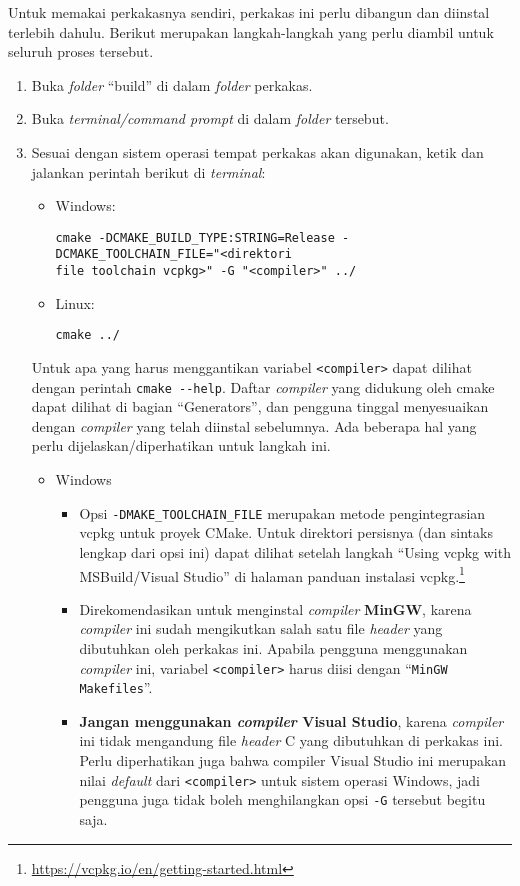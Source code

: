 Untuk memakai perkakasnya sendiri, perkakas ini perlu dibangun dan diinstal terlebih dahulu. Berikut merupakan langkah-langkah yang perlu diambil untuk seluruh proses tersebut.

\begin{enumerate}
	\item Buka \textit{folder} ``build'' di dalam \textit{folder} perkakas.
	\item Buka \textit{terminal/command prompt} di dalam \textit{folder} tersebut.
	\item Sesuai dengan sistem operasi tempat perkakas akan digunakan, ketik dan jalankan perintah berikut di \textit{terminal}:
	
	\begin{itemize}
		\item Windows:
		\begin{verbatim}
cmake -DCMAKE_BUILD_TYPE:STRING=Release -DCMAKE_TOOLCHAIN_FILE="<direktori
file toolchain vcpkg>" -G "<compiler>" ../
		\end{verbatim}
	
		\item Linux:
		\begin{verbatim}
cmake ../
		\end{verbatim}
	\end{itemize}		

	Untuk apa yang harus menggantikan variabel \verb|<compiler>| dapat dilihat dengan perintah \verb|cmake --help|. Daftar \textit{compiler} yang didukung oleh cmake dapat dilihat di bagian \mbox{``Generators''}, dan pengguna tinggal menyesuaikan dengan \textit{compiler} yang telah diinstal sebelumnya.  Ada beberapa hal yang perlu dijelaskan/diperhatikan untuk langkah ini.
	
	\begin{itemize}
		\item Windows
			
		\begin{itemize}
			\item Opsi \verb|-DMAKE_TOOLCHAIN_FILE| merupakan metode pengintegrasian vcpkg untuk proyek CMake. Untuk direktori persisnya (dan sintaks lengkap dari opsi ini) dapat dilihat setelah langkah ``Using vcpkg with MSBuild/Visual Studio'' di halaman panduan instalasi vcpkg.\footnote{\href{https://vcpkg.io/en/getting-started.html}{https://vcpkg.io/en/getting-started.html}}
			\item Direkomendasikan untuk menginstal \textit{compiler} \textbf{MinGW}, karena \textit{compiler} ini sudah mengikutkan salah satu file \textit{header} yang dibutuhkan oleh perkakas ini. Apabila pengguna menggunakan \textit{compiler} ini, variabel \verb|<compiler>| harus diisi dengan ``\verb|MinGW Makefiles|''.
			\item \textbf{Jangan menggunakan \textit{compiler} Visual Studio}, karena \textit{compiler} ini tidak mengandung file \textit{header} C yang dibutuhkan di perkakas ini. Perlu diperhatikan juga bahwa compiler Visual Studio ini merupakan nilai \textit{default} dari \verb|<compiler>| untuk sistem operasi Windows, jadi pengguna juga tidak boleh menghilangkan opsi \verb|-G| tersebut begitu saja.
		\end{itemize}
			

\end{itemize}
\end{enumerate}
